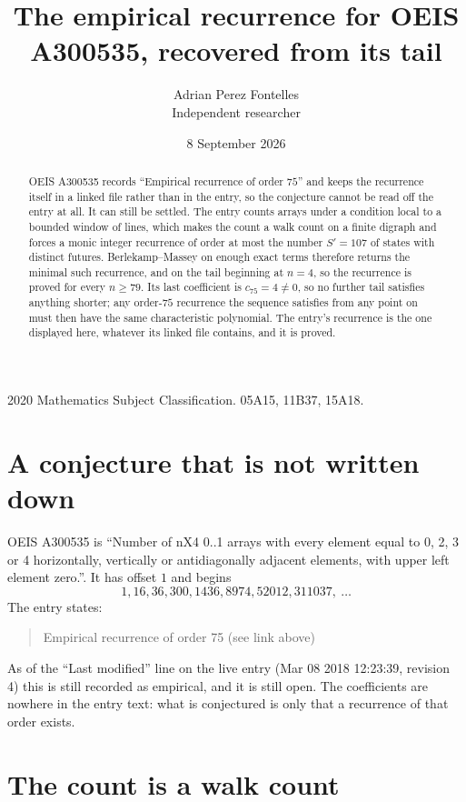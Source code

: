 \documentclass[11pt,a4paper]{article}
\title{The empirical recurrence for OEIS A300535, recovered from its tail}
\author{Adrian Perez Fontelles\\ \small Independent researcher}
\date{8 September 2026}
\theoremstyle{plain}
\theoremstyle{definition}
\begin{document}
\maketitle

\begin{abstract}
OEIS A300535 records ``Empirical recurrence of order $75$'' and keeps the recurrence itself in
a linked file rather than in the entry, so the conjecture cannot be read off the entry at all.
It can still be settled. The entry counts arrays under a condition local to a bounded window of
lines, which makes the count a walk count on a finite digraph and forces a monic integer
recurrence of order at most the number $S'=107$ of states with distinct futures. Berlekamp--Massey on
enough exact terms therefore returns the minimal such recurrence, and on the tail beginning at $n=4$, so the recurrence is proved for every $n\ge79$.
Its last coefficient is $c_{75}=4\neq0$, so no further tail satisfies anything
shorter; any order-$75$ recurrence the sequence satisfies from any point on must then have
the same characteristic polynomial. The entry's recurrence is the one displayed here, whatever
its linked file contains, and it is proved.
\end{abstract}

\noindent\small 2020 Mathematics Subject Classification. 05A15, 11B37, 15A18.\normalsize

\section{A conjecture that is not written down}

OEIS A300535 is ``Number of nX4 0..1 arrays with every element equal to 0, 2, 3 or 4 horizontally, vertically or antidiagonally adjacent elements, with upper left element zero.''. It has offset $1$ and begins
\[
1, 16, 36, 300, 1436, 8974, 52012, 311037,\ \dots
\]
The entry states:
\begin{quote}
Empirical recurrence of order 75 (see link above)
\end{quote}
As of the ``Last modified'' line on the live entry (Mar 08 2018 12:23:39, revision 4)
this is still recorded as empirical, and it is still open. The coefficients are nowhere in the
entry text: what is conjectured is only that a recurrence of that order exists.

\section{The count is a walk count}
\end{document}
